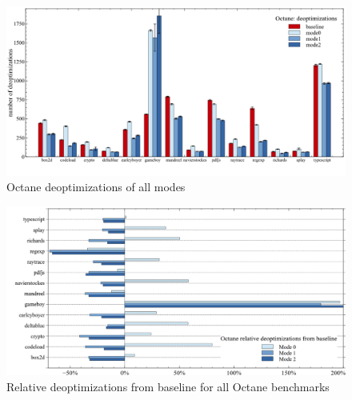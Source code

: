 \begin{figure}[ht]
  \begin{center}
    \centering
    \includegraphics[width=1.0\textwidth]{figures/octane_deopt.png}
    \caption{Octane deoptimizations of all modes} 
    \label{f:octane_deopt}
  \end{center}
\end{figure}



\begin{figure}[ht]
  \begin{center}
    \centering
    \includegraphics[width=1.0\textwidth]{figures/octane_variation_deopt.png}
    \caption{Relative deoptimizations from baseline for all Octane benchmarks}
    \label{f:octane_variation_deopt}
  \end{center}
\end{figure}

\clearpage
